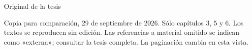 \documentclass[spanish,a4paper,12pt]{article}
\begin{document}
\begin{center}\Large Original de la tesis\end{center}
\noindent Copia para comparación, 29 de septiembre de 2026. Sólo capítulos 3, 5 y 6.
Los textos se reproducen sin edición. Las referencias a material omitido se indican
como «externa»; consultar la tesis completa. La paginación cambia en esta vista.
\tableofcontents

\clearpage
\setcounter{section}{2}
\label{review:03}


\clearpage
\setcounter{section}{4}
\label{review:05}


\clearpage
\setcounter{section}{5}
\label{review:06}


\clearpage
\printbibliography
\end{document}
